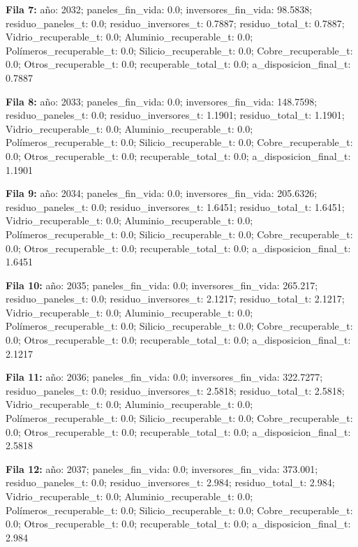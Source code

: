 {\footnotesize\textbf{Fila 7:} año: 2032; paneles\_fin\_vida: 0.0; inversores\_fin\_vida: 98.5838; residuo\_paneles\_t: 0.0; residuo\_inversores\_t: 0.7887; residuo\_total\_t: 0.7887; Vidrio\_recuperable\_t: 0.0; Aluminio\_recuperable\_t: 0.0; Polímeros\_recuperable\_t: 0.0; Silicio\_recuperable\_t: 0.0; Cobre\_recuperable\_t: 0.0; Otros\_recuperable\_t: 0.0; recuperable\_total\_t: 0.0; a\_disposicion\_final\_t: 0.7887\par}
{\footnotesize\textbf{Fila 8:} año: 2033; paneles\_fin\_vida: 0.0; inversores\_fin\_vida: 148.7598; residuo\_paneles\_t: 0.0; residuo\_inversores\_t: 1.1901; residuo\_total\_t: 1.1901; Vidrio\_recuperable\_t: 0.0; Aluminio\_recuperable\_t: 0.0; Polímeros\_recuperable\_t: 0.0; Silicio\_recuperable\_t: 0.0; Cobre\_recuperable\_t: 0.0; Otros\_recuperable\_t: 0.0; recuperable\_total\_t: 0.0; a\_disposicion\_final\_t: 1.1901\par}
{\footnotesize\textbf{Fila 9:} año: 2034; paneles\_fin\_vida: 0.0; inversores\_fin\_vida: 205.6326; residuo\_paneles\_t: 0.0; residuo\_inversores\_t: 1.6451; residuo\_total\_t: 1.6451; Vidrio\_recuperable\_t: 0.0; Aluminio\_recuperable\_t: 0.0; Polímeros\_recuperable\_t: 0.0; Silicio\_recuperable\_t: 0.0; Cobre\_recuperable\_t: 0.0; Otros\_recuperable\_t: 0.0; recuperable\_total\_t: 0.0; a\_disposicion\_final\_t: 1.6451\par}
{\footnotesize\textbf{Fila 10:} año: 2035; paneles\_fin\_vida: 0.0; inversores\_fin\_vida: 265.217; residuo\_paneles\_t: 0.0; residuo\_inversores\_t: 2.1217; residuo\_total\_t: 2.1217; Vidrio\_recuperable\_t: 0.0; Aluminio\_recuperable\_t: 0.0; Polímeros\_recuperable\_t: 0.0; Silicio\_recuperable\_t: 0.0; Cobre\_recuperable\_t: 0.0; Otros\_recuperable\_t: 0.0; recuperable\_total\_t: 0.0; a\_disposicion\_final\_t: 2.1217\par}
{\footnotesize\textbf{Fila 11:} año: 2036; paneles\_fin\_vida: 0.0; inversores\_fin\_vida: 322.7277; residuo\_paneles\_t: 0.0; residuo\_inversores\_t: 2.5818; residuo\_total\_t: 2.5818; Vidrio\_recuperable\_t: 0.0; Aluminio\_recuperable\_t: 0.0; Polímeros\_recuperable\_t: 0.0; Silicio\_recuperable\_t: 0.0; Cobre\_recuperable\_t: 0.0; Otros\_recuperable\_t: 0.0; recuperable\_total\_t: 0.0; a\_disposicion\_final\_t: 2.5818\par}
{\footnotesize\textbf{Fila 12:} año: 2037; paneles\_fin\_vida: 0.0; inversores\_fin\_vida: 373.001; residuo\_paneles\_t: 0.0; residuo\_inversores\_t: 2.984; residuo\_total\_t: 2.984; Vidrio\_recuperable\_t: 0.0; Aluminio\_recuperable\_t: 0.0; Polímeros\_recuperable\_t: 0.0; Silicio\_recuperable\_t: 0.0; Cobre\_recuperable\_t: 0.0; Otros\_recuperable\_t: 0.0; recuperable\_total\_t: 0.0; a\_disposicion\_final\_t: 2.984\par}
